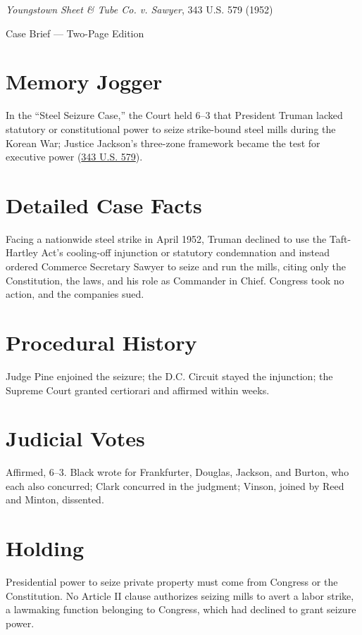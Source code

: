 \documentclass[12pt]{article}
\begin{document}
\begin{center}
{\LARGE \textit{Youngstown Sheet \& Tube Co. v. Sawyer}, 343 U.S. 579 (1952)\par}
\vspace{0.5em}
{\large Case Brief --- Two-Page Edition\par}
\end{center}

\section{Memory Jogger}
In the ``Steel Seizure Case,'' the Court held 6--3 that President Truman lacked statutory or constitutional power to seize strike-bound steel mills during the Korean War; Justice Jackson's three-zone framework became the test for executive power (\href{https://supreme.justia.com/cases/federal/us/343/579/}{343 U.S. 579}).

\section{Detailed Case Facts}
Facing a nationwide steel strike in April 1952, Truman declined to use the Taft-Hartley Act's cooling-off injunction or statutory condemnation and instead ordered Commerce Secretary Sawyer to seize and run the mills, citing only the Constitution, the laws, and his role as Commander in Chief. Congress took no action, and the companies sued.

\section{Procedural History}
Judge Pine enjoined the seizure; the D.C. Circuit stayed the injunction; the Supreme Court granted certiorari and affirmed within weeks.

\section{Judicial Votes}
Affirmed, 6--3. Black wrote for Frankfurter, Douglas, Jackson, and Burton, who each also concurred; Clark concurred in the judgment; Vinson, joined by Reed and Minton, dissented.

\section{Holding}
Presidential power to seize private property must come from Congress or the Constitution. No Article II clause authorizes seizing mills to avert a labor strike, a lawmaking function belonging to Congress, which had declined to grant seizure power.
\end{document}
